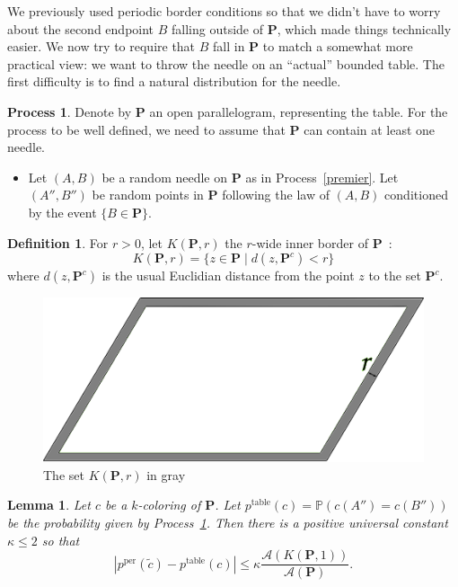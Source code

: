 \documentclass[a4paper,11pt]{article}
\newtheorem{lemma}{Lemma}
\theoremstyle{definition}
\newtheorem{definition}{Definition}
\newtheorem{process}{Process}
\theoremstyle{remark}
\renewcommand{\Pr}{\mathbb{P}}
\renewcommand{\P}{\mathbf{P}}
\newcommand{\pper}{p^{\mathrm{per}}}
\newcommand{\ptable}{p^{\mathrm{table}}}
\begin{document}
We previously used periodic border conditions so that we didn't have to worry about the second 
endpoint $B$ falling outside of $\mathbf{P}$, which made things technically easier. We now 
try to require that $B$ fall in $\mathbf{P}$ to match a somewhat more practical 
view: we want to throw the needle on an ``actual'' bounded 
table. The first difficulty is to find a natural distribution for the needle.

\begin{process} \label{encore}
Denote by $\mathbf{P}$ an open parallelogram, representing the table. For the 
process to be well defined, we need to assume that $\mathbf{P}$ can contain at
least one needle.
\begin{itemize}
\item Let $(A,B)$ be a random needle on $\P$ as in Process~\ref{premier}. Let $(A'',B'')$ be random points in $\P$ following the law
of $(A,B)$ conditioned by the event $\{B \in \mathbf{P} \}$.
\end{itemize}
\end{process}

\begin{definition}
For $r>0$, let $K(\mathbf{P},r)$ the $r$-wide inner border of $\mathbf{P}$~:
\[K(\mathbf{P},r) = \{ z \in \mathbf{P} \mid d(z,\mathbf{P}^c) < r\} \]
where $d(z,\mathbf{P}^c)$ is the usual Euclidian distance from the point $z$ to the set $\mathbf{P}^c$.
\end{definition}

\begin{figure}[h]
\center
\includegraphics[scale=0.5]{tablefinie.png}
\caption{\label{tablefinie} The set $K(\mathbf{P},r)$ in gray}
\end{figure}

\begin{lemma}\label{choco}
Let $c$ be a $k$-coloring of $\mathbf{P}$. Let
$\ptable(c) = \Pr(c(A'')=c(B''))$ be the probability given by Process~\ref{encore}. Then 
there is a positive universal constant $\kappa \leq 2$ so that 
$$ | \pper(\tilde{c}) - \ptable(c)| \leq \kappa \frac{\mathcal{A}(K(\mathbf{P},1))}{\mathcal{A}(\mathbf{P})}.$$
\end{lemma}
\end{document}
